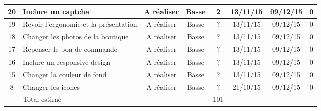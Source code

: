 \begin{tabular}{ | c | p{4cm} | c | c | c | c | c | c |  }
20 & Inclure un captcha & A réaliser & Basse & 2 & 13/11/15 &
	09/12/15 & 0  \\ \hline
19 & Revoir l'ergonomie et la présentation & A réaliser & Basse & ? & 13/11/15
	& 09/12/15 & 0  \\ \hline
18 & Changer les photos de la boutique & A réaliser & Basse & ? & 13/11/15 &
	09/12/15 & 0 \\ \hline
17 & Repenser le bon de commande & A réaliser & Basse & ? & 13/11/15 & 09/12/15
	& 0  \\ \hline
16 & Inclure un responsive design & A réaliser & Basse & ? &
	13/11/15 & 09/12/15 & 0  \\ \hline
15 & Changer la couleur de fond & A réaliser & Basse & ? & 13/11/15 & 09/12/15
	& 0   \\ \hline
8 & Changer les icones & A réaliser & Basse & ? & 21/10/15 & 09/12/15 & 0 \\
\hline

 & Total estimé &  &  & 101 &  &  &  \\ \hline
 \end{tabular}